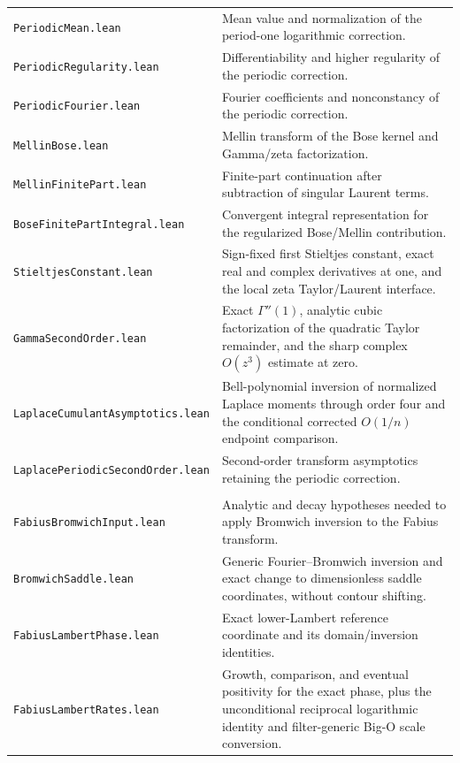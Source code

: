 \documentclass[11pt,oneside]{article}
\theoremstyle{definition}
\theoremstyle{remark}
\begin{document}
\begin{longtable}{>{\raggedright\arraybackslash}p{} >{\raggedright\arraybackslash}p{}}
\nolinkurl{PeriodicMean.lean} & Mean value and normalization of the period-one logarithmic correction. \\
\nolinkurl{PeriodicRegularity.lean} & Differentiability and higher regularity of the periodic correction. \\
\nolinkurl{PeriodicFourier.lean} & Fourier coefficients and nonconstancy of the periodic correction. \\
\nolinkurl{MellinBose.lean} & Mellin transform of the Bose kernel and Gamma/zeta factorization. \\
\nolinkurl{MellinFinitePart.lean} & Finite-part continuation after subtraction of singular Laurent terms. \\
\nolinkurl{BoseFinitePartIntegral.lean} & Convergent integral representation for the regularized Bose/Mellin contribution. \\
\nolinkurl{StieltjesConstant.lean} & Sign-fixed first Stieltjes constant, exact real and complex derivatives at one, and the local zeta Taylor/Laurent interface. \\
\nolinkurl{GammaSecondOrder.lean} & Exact \(\Gamma''(1)\), analytic cubic factorization of the quadratic Taylor remainder, and the sharp complex \(O(z^3)\) estimate at zero. \\
\nolinkurl{LaplaceCumulantAsymptotics.lean} & Bell-polynomial inversion of normalized Laplace moments through order four and the conditional corrected \(O(1/n)\) endpoint comparison. \\
\nolinkurl{LaplacePeriodicSecondOrder.lean} & Second-order transform asymptotics retaining the periodic correction. \\
\addlinespace[0.45em]
\multicolumn{2}{l}{\textbf{Bromwich and Lambert saddle analysis}}\\[0.25em]
\nolinkurl{FabiusBromwichInput.lean} & Analytic and decay hypotheses needed to apply Bromwich inversion to the Fabius transform. \\
\nolinkurl{BromwichSaddle.lean} & Generic Fourier--Bromwich inversion and exact change to dimensionless saddle coordinates, without contour shifting. \\
\nolinkurl{FabiusLambertPhase.lean} & Exact lower-Lambert reference coordinate and its domain/inversion identities. \\
\nolinkurl{FabiusLambertRates.lean} & Growth, comparison, and eventual positivity for the exact phase, plus the unconditional reciprocal logarithmic identity and filter-generic Big-O scale conversion. \\

\end{longtable}
\end{document}

